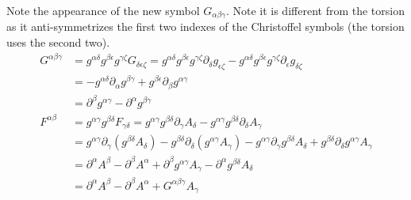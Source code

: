 \documentclass[11pt]{article}
\begin{document}
Note the appearance of the new symbol $G_{\alpha\beta\gamma}$. Note it is different from the torsion as it anti-symmetrizes the first two indexes of the Christoffel symbols (the torsion uses the second two).
\begin{equation}
\begin{aligned}
G^{\alpha\beta\gamma} &= g^{\alpha\delta}g^{\beta\epsilon}g^{\gamma\zeta} G_{\delta\epsilon\zeta} = g^{\alpha\delta}g^{\beta\epsilon}g^{\gamma\zeta} \partial_\delta g_{\epsilon\zeta} - g^{\alpha\delta}g^{\beta\epsilon}g^{\gamma\zeta} \partial_\epsilon g_{\delta\zeta}\\
&= - g^{\alpha\delta} \partial_\alpha g^{\beta\gamma} + g^{\beta\epsilon} \partial_\beta g^{\alpha\gamma} \\
&= \partial^\beta g^{\alpha\gamma} - \partial^\alpha g^{\beta\gamma} \\
F^{\alpha\beta} &= g^{\alpha\gamma}g^{\beta\delta} F_{\gamma\delta} = g^{\alpha\gamma}g^{\beta\delta} \partial_\gamma A_{\delta} - g^{\alpha\gamma}g^{\beta\delta} \partial_\delta A_{\gamma}  \\
&= g^{\alpha\gamma} \partial_\gamma (g^{\beta\delta} A_{\delta}) - g^{\beta\delta} \partial_\delta ( g^{\alpha\gamma}A_{\gamma}) - g^{\alpha\gamma} \partial_\gamma g^{\beta\delta} A_{\delta} + g^{\beta\delta} \partial_\delta g^{\alpha\gamma}A_{\gamma}\\
&= \partial^\alpha A^\beta - \partial^\beta A^\alpha + \partial ^\beta g^{\alpha \gamma} A_\gamma - \partial^\alpha g^{\beta \delta} A_\delta\\
&= \partial^\alpha A^\beta - \partial^\beta A^\alpha +G^{\alpha\beta\gamma} A_\gamma
\end{aligned}
\end{equation}
\end{document}
